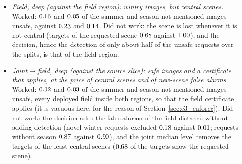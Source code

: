 \documentclass{article}
\theoremstyle{plain}
\theoremstyle{remark}
\begin{document}
\begin{itemize}
of those without season excluded, $\ethFAPBS$ of the safe unfamiliar ones), gets the targets of the field region (every one of the
requested scene) with a scene similarity close to that of the requests' own images ($\ethcSubjSFlSum$ and $\ethcSubjSFlNeu$), and leaves
fewer unsafe images than either previous method ($\ethcAfterSFlSum$ of the summer images and $\ethcAfterSFlNeu$ of those without
season, against $\ethcAfterSSum$ and $\ethcAfterSNeu$ for the source slice and $\ethcAfterFSum$ and $\ethcAfterFNeu$ for the field
region). Two new methods leave even fewer unsafe summer images, Mahalanobis$\to$field ($\ethcAfterMFSum$) and joint$\to$field, deep
($\ethcAfterJFdSum$), but the first alters every unfamiliar safe request and the second loses the scene in a third of its repairs.
Did not work, or not shown: it was designed after the other results and evaluated on the same $\ethNreqKind$ requests of each
kind; its deployed fields are not all within the field region ($\ethcInFSFl$ are), so they carry no output certificate; every
bisection step needs a sampling run, as for the field regions; and it repairs only what the source slice excludes, so the
$\ethcAdmNeuS$ of the requests without season that the source slice admits over the splits are served as asked.
\item \emph{Field, deep (against the field region): wintry images, but central scenes.} Worked: $0.16$ and $0.05$ of
the summer and season-not-mentioned images unsafe, against $\ethcAfterFSum$ and $\ethcAfterFNeu$. Did not work: the scene is lost
whenever it is not central (targets of the requested scene $0.68$ against $1.00$), and the decision, hence the
detection of only about half of the unsafe requests over the splits, is that of the field region.
\item \emph{Joint$\to$field, deep (against the source slice): safe images and a certificate that applies, at the price of central
scenes and of new-scene false alarms.} Worked: $\ethcAfterJFdSum$ and $0.03$ of the summer and season-not-mentioned images
unsafe, every deployed field inside both regions, so that the field certificate applies (it is vacuous here, for the reason of
Section~\ref{sec:e3_enforce}). Did not work: the decision adds the false alarms of the field distance without adding detection
(novel winter requests excluded $0.18$ against $0.01$; requests without season $0.87$ against $0.90$), and
the joint median level removes the targets of the least central scenes ($0.68$ of the targets show the requested scene).

\end{itemize}
\end{document}

